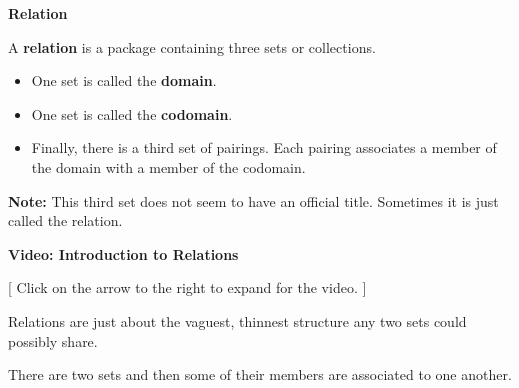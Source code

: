 \documentclass{ximera}
\begin{document}
\begin{definition} \textbf{\textcolor{green!50!black}{Relation}}  

A \textbf{relation} is a package containing three sets or collections. 


\begin{itemize}
\item One set is called the \textbf{\textcolor{purple!85!blue}{domain}}. 
\item One set is called the \textbf{\textcolor{purple!85!blue}{codomain}}.  
\item Finally, there is a third set of pairings.  Each pairing associates a member of the domain with a member of the codomain. 
\end{itemize}

\textbf{Note:} This third set does not seem to have an official title. Sometimes it is just called the relation.

\end{definition}












\begin{onlineOnly}
\begin{explanation} \textbf{\textcolor{red!75!green}{Video: Introduction to Relations}}  

[ Click on the arrow to the right to expand for the video. ]
\begin{expandable} 

\begin{center}
\end{center}

\end{expandable}

\end{explanation}
\end{onlineOnly}








\newpage

Relations are just about the vaguest, thinnest structure any two sets could possibly share. 

\begin{center}
There are two sets and then some of their members are associated to one another. 
\end{center}
\end{document}
